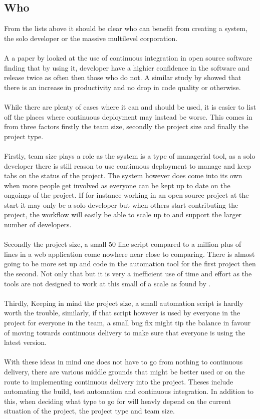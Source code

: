\subsection{Who}

From the lists above it should be clear who can benefit from creating a system, the solo developer or the massive multilevel corporation.
\\\\
A a paper by \cite{ossuse} looked at the use of continuous integration in open source software finding that by using it, developer have a highier confidence in the software and release twice as often then those who do not. A similar study by \cite{ossprod} showed that there is an increase in productivity and no drop in code quality or otherwise.
\\\\
While there are plenty of cases where it can and should be used, it is easier to list off the places where continuous deployment may instead be worse. This comes in from three factors firstly the team size, secondly the project size and finally the project type.
\\\\
Firstly, team size plays a role as the system is a type of managerial tool, as a solo developer there is still reason to use continuous deployment to manage and keep tabs on the status of the project. The system however does come into its own when more people get involved as everyone can be kept up to date on the ongoings of the project. If for instance working in an open source project at the start it may only be a solo developer but when others start contributing the project, the workflow will easily be able to scale up to and support the larger number of developers.
\\\\
Secondly the project size, a small 50 line script compared to a million plus of lines in a web application come nowhere near close to comparing. There is almost going to be more set up and code in the automation tool for the first project then the second. Not only that but it is very a inefficient use of time and effort as the tools are not designed to work at this small of a scale as found by \cite{smallci}.
\\\\
Thirdly, Keeping in mind the project size, a small automation script is hardly worth the trouble, similarly, if that script however is used by everyone in the project for everyone in the team, a small bug fix  might tip the balance in favour of moving towards continuous delivery to make sure that everyone is using the latest version. 
\\\\
With these ideas in mind one does not have to go from nothing to continuous delivery, there are various middle grounds that might be better used or on the route to implementing continuous delivery into the project. Theses include automating the build, test automation and continuous integration. In addition to this, when deciding what type to go for will heavly depend on the current situation of the project, the project type and team size.

